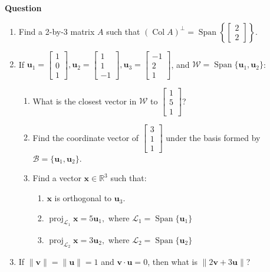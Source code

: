 \documentclass[10pt, titlepage]{article}
\newcounter{question}
\newenvironment{newquestion}
{
	\noindent\textbf{Question \thequestion}
}
{
\stepcounter{question}
\par
}
\renewcommand{\vec}[1]{\bm{#1}}
\DeclareMathOperator{\vspan}{Span}
\DeclareMathOperator{\colspace}{Col}
\DeclareMathOperator{\proj}{proj}
\begin{document}
\begin{newquestion}
\begin{enumerate}
		\item Find a 2-by-3 matrix \(A\) such that \((\colspace A)^\perp = \vspan\left\{\!\begin{bmatrix}2 \\ 2\end{bmatrix}\!\right\}\).
			\item If \(\vec{u}_1 = \begin{bmatrix}1 \\ 0 \\ 1\end{bmatrix}, \vec{u}_2 = \begin{bmatrix}1 \\ 1 \\ -1\end{bmatrix}, 
			      \vec{u}_3 = \begin{bmatrix}-1 \\ 2 \\ 1\end{bmatrix}\), and \(\mathcal{W} = \vspan \{\vec{u}_1, \vec{u}_2\}\):
			\begin{enumerate}
				\item What is the closest vector in \(\mathcal{W}\) to \(\begin{bmatrix}1 \\ 5 \\ 1\end{bmatrix}\)?
				\item Find the coordinate vector of \(\begin{bmatrix}3 \\ 1 \\ 1\end{bmatrix}\) under the basis formed by 
				\(\mathcal{B} = \{\vec{u}_1, \vec{u}_2\}\).
				\item Find a vector \(\vec{x} \in \mathbb{R}^3\) such that:
					\begin{enumerate}
						\item \(\vec{x}\) is orthogonal to \(\vec{u}_3\).
						\item \(\proj_{\mathcal{L}_1} \vec{x} = 5\vec{u}_1,\) where \(\mathcal{L}_1 = \vspan \{\vec{u}_1\}\)
						\item \(\proj_{\mathcal{L}_2} \vec{x} = 3\vec{u}_2,\) where \(\mathcal{L}_2 = \vspan\{\vec{u}_2\}\)
					\end{enumerate} 
			\end{enumerate}
		\item If \(\|\vec{v}\| = \|\vec{u}\| = 1\) and \(\vec{v} \cdot \vec{u} = 0\), then what is \(\|2\vec{v} + 3\vec{u}\|\)?

\end{enumerate}
\end{newquestion}
\end{document}
